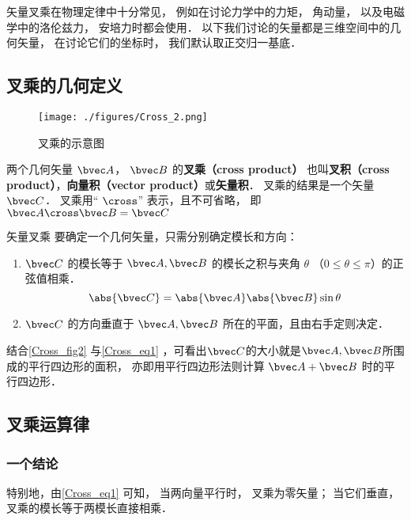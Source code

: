 

矢量叉乘在物理定律中十分常见， 例如在讨论力学中的力矩， 角动量， 以及电磁学中的洛伦兹力， 安培力时都会使用． 以下我们讨论的矢量都是三维空间中的几何矢量， 在讨论它们的坐标时， 我们默认取正交归一基底．

\subsection{叉乘的几何定义}

\begin{figure}[ht]
\centering
\texttt{[image: ./figures/Cross\_2.png]}
\caption{叉乘的示意图} \label{Cross_fig2}
\end{figure}

两个几何矢量 $\bvec A$，  $\bvec B$ 的\textbf{叉乘（cross product）} 也叫\textbf{叉积（cross product）}，\textbf{向量积（vector product）}或\textbf{矢量积}． 叉乘的结果是一个矢量 $\bvec C$．  叉乘用“ $\cross$” 表示，且不可省略， 即 $ \bvec A \cross \bvec B = \bvec C$

\begin{definition}{矢量叉乘}\label{Cross_def1}
要确定一个几何矢量，只需分别确定模长和方向：
\begin{enumerate}
\item $\bvec C$ 的模长等于 $\bvec A, \bvec B$ 的模长之积与夹角 $\theta$ （$0 \leqslant \theta \leqslant \pi$）的正弦值相乘．
\begin{equation}\label{Cross_eq1}
\abs{\bvec C}  = \abs{\bvec A} \abs{\bvec B} \sin\theta 
\end{equation}
\item $\bvec C$ 的方向垂直于 $\bvec A, \bvec B$ 所在的平面，且由右手定则决定．
\end{enumerate}
\end{definition}

结合\autoref{Cross_fig2} 与\autoref{Cross_eq1} ，可看出$\bvec C$的大小就是$\bvec A, \bvec B$所围成的平行四边形的面积， 亦即用平行四边形法则计算 $\bvec A + \bvec B$ 时的平行四边形．

\subsection{叉乘运算律}
\subsubsection{一个结论}
特别地，由\autoref{Cross_eq1} 可知， 当两向量平行时， 叉乘为零矢量； 当它们垂直， 叉乘的模长等于两模长直接相乘．%


